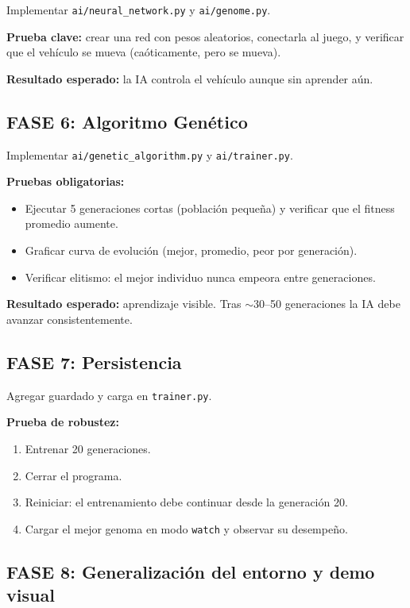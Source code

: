 \documentclass[11pt,a4paper]{article}
\begin{document}
Implementar \texttt{ai/neural\_network.py} y \texttt{ai/genome.py}.

\textbf{Prueba clave:} crear una red con pesos aleatorios, conectarla al juego, y verificar que el vehículo se mueva (caóticamente, pero se mueva).

\textbf{Resultado esperado:} la IA controla el vehículo aunque sin aprender aún.

\subsection{FASE 6: Algoritmo Genético}

Implementar \texttt{ai/genetic\_algorithm.py} y \texttt{ai/trainer.py}.

\textbf{Pruebas obligatorias:}
\begin{itemize}
    \item Ejecutar 5 generaciones cortas (población pequeña) y verificar que el fitness promedio aumente.
    \item Graficar curva de evolución (mejor, promedio, peor por generación).
    \item Verificar elitismo: el mejor individuo nunca empeora entre generaciones.
\end{itemize}

\textbf{Resultado esperado:} aprendizaje visible. Tras $\sim$30--50 generaciones la IA debe avanzar consistentemente.

\subsection{FASE 7: Persistencia}

Agregar guardado y carga en \texttt{trainer.py}.

\textbf{Prueba de robustez:}
\begin{enumerate}
    \item Entrenar 20 generaciones.
    \item Cerrar el programa.
    \item Reiniciar: el entrenamiento debe continuar desde la generación 20.
    \item Cargar el mejor genoma en modo \texttt{watch} y observar su desempeño.
\end{enumerate}

\subsection{FASE 8: Generalización del entorno y demo visual}
\end{document}
